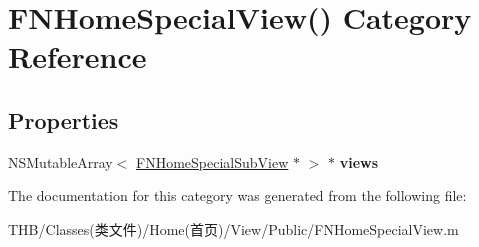 \hypertarget{category_f_n_home_special_view_07_08}{}\section{F\+N\+Home\+Special\+View() Category Reference}
\label{category_f_n_home_special_view_07_08}
\subsection*{Properties}
\begin{DoxyCompactItemize}
\item 
\mbox{\label{category_f_n_home_special_view_07_08_ac3a62c5ce60e9b452f9738dd76ead602}} 
N\+S\+Mutable\+Array$<$ \mbox{\hyperlink{interface_f_n_home_special_sub_view}{F\+N\+Home\+Special\+Sub\+View}} $\ast$ $>$ $\ast$ {\bfseries views}
\end{DoxyCompactItemize}


The documentation for this category was generated from the following file\+:\begin{DoxyCompactItemize}
\item 
T\+H\+B/\+Classes(类文件)/\+Home(首页)/\+View/\+Public/F\+N\+Home\+Special\+View.\+m\end{DoxyCompactItemize}
